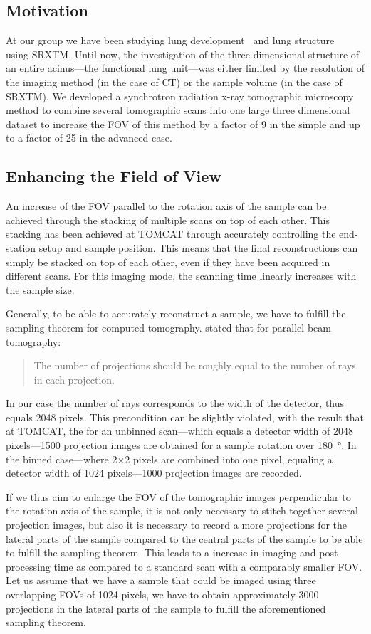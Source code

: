 \subsection{Motivation}
At our group we have been studying lung development~\cite{Schittny2008,Mund2008} and lung structure~\cite{Tsuda2008} using SRXTM. Until now, the investigation of the three dimensional structure of an entire acinus---the functional lung unit---was either limited by the resolution of the imaging method (in the case of \micro CT) or the sample volume (in the case of SRXTM). We developed a synchrotron radiation x-ray tomographic microscopy method to combine several tomographic scans into one large three dimensional dataset to increase the FOV of this method by a factor of 9 in the simple and up to a factor of 25 in the advanced case.

\subsection{Enhancing the Field of View}
\label{subsec:enhancing the field of view}
An increase of the FOV parallel to the rotation axis of the sample can be achieved through the stacking of multiple scans on top of each other. This stacking has been achieved at TOMCAT through accurately controlling the end-station setup and sample position.
This means that the final reconstructions can simply be stacked on top of each other, even if they have been acquired in different scans. For this imaging mode, the scanning time linearly increases with the sample size.

Generally, to be able to accurately reconstruct a sample, we have to fulfill the sampling theorem for computed tomography. \citet{Kak2002} stated that for parallel beam tomography: \begin{quote} The number of projections should be roughly equal to the number of rays in each projection. \end{quote} In our case the number of rays corresponds to the width of the detector, thus equals 2048 pixels. This precondition can be slightly violated, with the result that at TOMCAT, the for an unbinned scan---which equals a detector width of 2048 pixels---1500 projection images are obtained for a sample rotation over \SI{180}{\degree}. In the binned case---where 2$\times$2 pixels are combined into one pixel, equaling a detector width of 1024 pixels---1000 projection images are recorded.

If we thus aim to enlarge the FOV of the tomographic images perpendicular to the rotation axis of the sample, it is not only necessary to stitch together several projection images, but also it is necessary to record a more projections for the lateral parts of the sample compared to the central parts of the sample to be able to fulfill the sampling theorem. This leads to a increase in imaging and post-processing time as compared to a standard scan with a comparably smaller FOV. Let us assume that we have a sample that could be imaged using three overlapping FOVs of 1024 pixels, we have to obtain approximately 3000 projections in the lateral parts of the sample to fulfill the aforementioned sampling theorem. 

